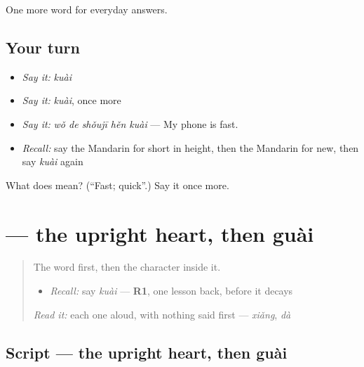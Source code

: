 \begin{grammarlens}[title={What you've built}]
One more word for everyday answers.
\end{grammarlens}

\subsection*{Your turn}
\begin{itemize}
\raggedright
  \item \emph{Say it:} \emph{kuài}
  \item \emph{Say it:} \emph{kuài}, once more
  \item \emph{Say it:} \emph{wǒ de shǒujī hěn kuài} — My phone is fast.
  \item \emph{Recall:} say the Mandarin for short in height, then the Mandarin for new, then say \emph{kuài} again
\end{itemize}

\begin{tcolorbox}[breakable,colback=teal!4,colframe=teal!35!black,title={Before you move on}]
What does  mean? (\textquotedblleft{}Fast; quick\textquotedblright{}.) Say it once more.
\end{tcolorbox}
\section[\texorpdfstring{\zh{快} (kuài)}{快 (kuài)}]{ — the upright heart, then guài}

\label{lesson:ZH-W62-kuai-fast}



\begin{quote}
The word first, then the character inside it.

\begin{itemize}
\raggedright
  \item \emph{Recall:} say \emph{kuài} — \textbf{R1}, one lesson back, before it decays
\end{itemize}

\begin{quote}
 
\end{quote}

\emph{Read it:} each one aloud, with nothing said first — \emph{xiǎng}, \emph{dà}
\end{quote}

\subsection*{Script — the upright heart, then guài}

